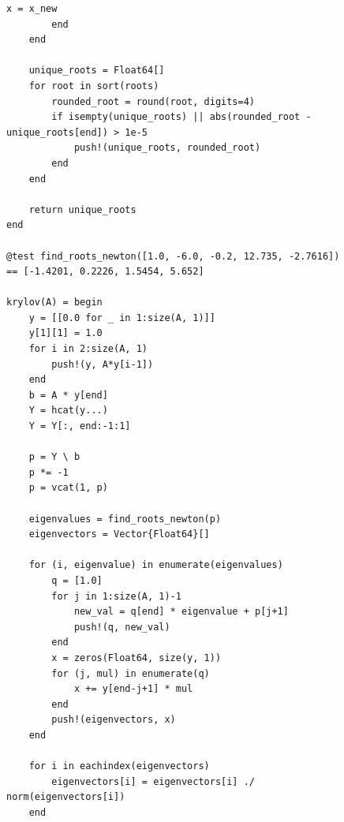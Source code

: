 \documentclass[a4paper, 14pt]{extarticle}
\begin{document}
\begin{figure}[!htb]
\begin{lstlisting}[language={},caption={Метод Крылова (продолжение)},label={lst:code5}]
            x = x_new
        end
    end

    unique_roots = Float64[]
    for root in sort(roots)
        rounded_root = round(root, digits=4)
        if isempty(unique_roots) || abs(rounded_root - unique_roots[end]) > 1e-5
            push!(unique_roots, rounded_root)
        end
    end

    return unique_roots
end

@test find_roots_newton([1.0, -6.0, -0.2, 12.735, -2.7616]) == [-1.4201, 0.2226, 1.5454, 5.652]

krylov(A) = begin
    y = [[0.0 for _ in 1:size(A, 1)]]
    y[1][1] = 1.0
    for i in 2:size(A, 1)
        push!(y, A*y[i-1])
    end
    b = A * y[end]
    Y = hcat(y...)
    Y = Y[:, end:-1:1]

    p = Y \ b
    p *= -1
    p = vcat(1, p)

    eigenvalues = find_roots_newton(p)
    eigenvectors = Vector{Float64}[]

    for (i, eigenvalue) in enumerate(eigenvalues)
        q = [1.0]
        for j in 1:size(A, 1)-1
            new_val = q[end] * eigenvalue + p[j+1]
            push!(q, new_val)
        end
        x = zeros(Float64, size(y, 1))
        for (j, mul) in enumerate(q)
            x += y[end-j+1] * mul
        end
        push!(eigenvectors, x)
    end

    for i in eachindex(eigenvectors)
        eigenvectors[i] = eigenvectors[i] ./ norm(eigenvectors[i])
    end
\end{lstlisting}
\end{figure}
\end{document}
